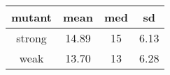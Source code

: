 
\begin{tabular}{cccc}
\toprule
mutant & mean & med & sd\\
\midrule
strong & 14.89 & 15 & 6.13\\
weak & 13.70 & 13 & 6.28\\
\bottomrule
\end{tabular}
